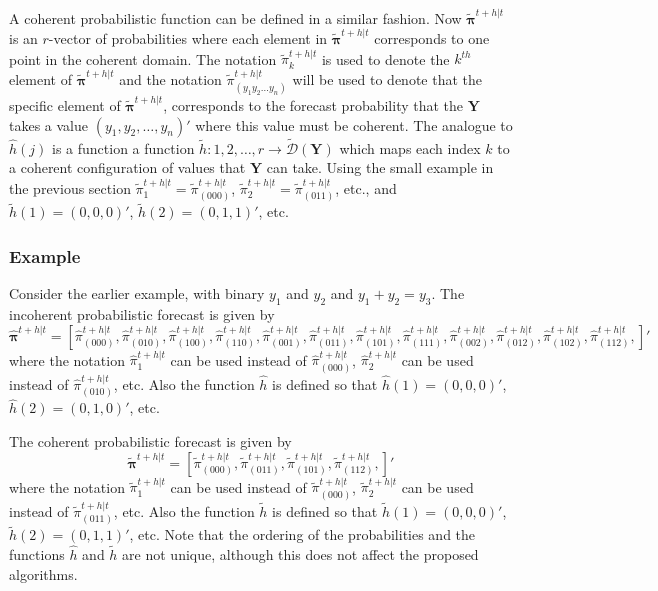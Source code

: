 \documentclass[a4paper,review,12pt,authoryear]{elsarticle}
\newcommand{\bY}{\mathbf{Y}}
\newcommand{\bpi}{\bm{\pi}}
\begin{document}
  A coherent probabilistic function can be defined in a similar fashion. Now $\tilde{\bpi}^{t+h|t}$ is an $r$-vector of probabilities where each element in $\tilde{\bpi}^{t+h|t}$ corresponds to one point in the coherent domain. The notation $\tilde{\pi}_k^{t+h|t}$ is used to denote the $k^{th}$ element of $\tilde{\bpi}^{t+h|t}$ and the notation $\tilde{\pi}_{(y_1 y_2 \dots y_n)}^{t+h|t}$ will be used to denote that the specific element of $\tilde{\bpi}^{t+h|t}$, corresponds to the forecast probability that the $\bY$ takes a value $(y_1,y_2,\dots,y_n)'$ where this value must be coherent. The analogue to $\hat{h}(j)$ is a function a function $\tilde{h}:{1,2,\dots,r}\rightarrow\tilde{\mathcal{D}}(\bY)$ which maps each index $k$ to a coherent configuration of values that $\bY$ can take. Using the small example in the previous section $\tilde{\pi}_1^{t+h|t}=\tilde{\pi}_{(000)}^{t+h|t}$, $\tilde{\pi}_2^{t+h|t}=\tilde{\pi}_{(011)}^{t+h|t}$, etc., and $\tilde{h}(1)=(0,0,0)'$, $\tilde{h}(2)=(0,1,1)'$, etc.
  
  \subsubsection*{\textbf{Example}}
  
  Consider the earlier example, with binary $y_1$ and $y_2$ and $y_1+y_2=y_3$. The incoherent probabilistic forecast is given by
  \[
    \hat{\bpi}^{t+h|t}= \left[       
      \hat{\pi}^{t+h|t}_{(000)},
       \hat{\pi}^{t+h|t}_{(010)},
       \hat{\pi}^{t+h|t}_{(100)},
       \hat{\pi}^{t+h|t}_{(110)},
       \hat{\pi}^{t+h|t}_{(001)},
       \hat{\pi}^{t+h|t}_{(011)},
       \hat{\pi}^{t+h|t}_{(101)},
       \hat{\pi}^{t+h|t}_{(111)},
       \hat{\pi}^{t+h|t}_{(002)},
       \hat{\pi}^{t+h|t}_{(012)},
       \hat{\pi}^{t+h|t}_{(102)},
       \hat{\pi}^{t+h|t}_{(112)},
       \right]'
  \]
  where the notation $\hat{\pi}^{t+h|t}_{1}$ can be used instead of $\hat{\pi}^{t+h|t}_{(000)}$, $\hat{\pi}^{t+h|t}_{2}$ can be used instead of $\hat{\pi}^{t+h|t}_{(010)}$, etc. Also the function $\hat{h}$ is defined so that $\hat{h}(1)=(0,0,0)'$, $\hat{h}(2)=(0,1,0)'$, etc.
  
  The coherent probabilistic forecast is given by
  \[
  \tilde{\bpi}^{t+h|t}=\left[
  \tilde{\pi}^{t+h|t}_{(000)},
  \tilde{\pi}^{t+h|t}_{(011)},
  \tilde{\pi}^{t+h|t}_{(101)},
  \tilde{\pi}^{t+h|t}_{(112)},
  \right]'\]
  where the notation $\tilde{\pi}^{t+h|t}_{1}$ can be used instead of $\tilde{\pi}^{t+h|t}_{(000)}$, $\tilde{\pi}^{t+h|t}_{2}$ can be used instead of $\tilde{\pi}^{t+h|t}_{(011)}$, etc. Also the function $\tilde{h}$ is defined so that $\tilde{h}(1)=(0,0,0)'$, $\tilde{h}(2)=(0,1,1)'$, etc. Note that the ordering of the probabilities and the functions $\hat{h}$ and $\tilde{h}$ are not unique, although this does not affect the proposed algorithms.
\end{document}
